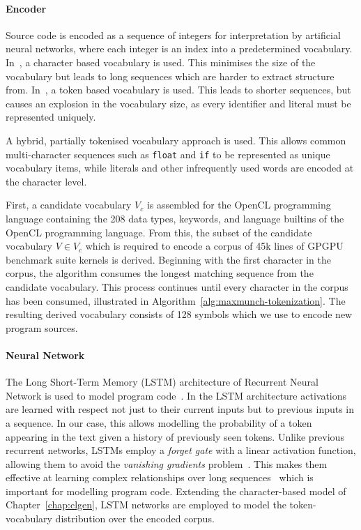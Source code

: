 \paragraph*{Encoder}

Source code is encoded as a sequence of integers for interpretation by artificial neural networks, where each integer is an index into a predetermined vocabulary. In~\cite{Jozefowicz2016a}, a character based vocabulary is used. This minimises the size of the vocabulary but leads to long sequences which are harder to extract structure from. In~\cite{Allamanis2013a}, a token based vocabulary is used. This leads to shorter sequences, but causes an explosion in the vocabulary size, as every identifier and literal must be represented uniquely.

A hybrid, partially tokenised vocabulary approach is used. This allows common multi-character sequences such as \texttt{float} and \texttt{if} to be represented as unique vocabulary items, while literals and other infrequently used words are encoded at the character level.

First, a candidate vocabulary $V_c$ is assembled for the OpenCL programming language containing the 208 data types, keywords, and language builtins of the OpenCL programming language. From this, the subset of the candidate vocabulary $V \in V_c$ which is required to encode a corpus of 45k lines of GPGPU benchmark suite kernels is derived. Beginning with the first character in the corpus, the algorithm consumes the longest matching sequence from the candidate vocabulary. This process continues until every character in the corpus has been consumed, illustrated in Algorithm~\ref{alg:maxmunch-tokenization}. The resulting derived vocabulary consists of 128 symbols which we use to encode new program sources.

\begin{algorithm}
  
  \caption[Deriving a vocabulary from a string]{%
  }
  \label{alg:maxmunch-tokenization}
\end{algorithm}

\paragraph*{Neural Network}

The Long Short-Term Memory (LSTM) architecture of Recurrent Neural Network is used to model program code~\cite{Hochreiter1997}. In the LSTM architecture activations are learned with respect not just to their current inputs but to previous inputs in a sequence. In our case, this allows modelling the probability of a token appearing in the text given a history of previously seen tokens. Unlike previous recurrent networks, LSTMs employ a \emph{forget gate} with a linear activation function, allowing them to avoid the \emph{vanishing gradients} problem~\cite{Pacanu2013}. This makes them effective at learning complex relationships over long sequences~\cite{Lipton2015} which is important for modelling program code. Extending the character-based model of Chapter~\ref{chap:clgen}, LSTM networks are employed to model the token-vocabulary distribution over the encoded corpus.

